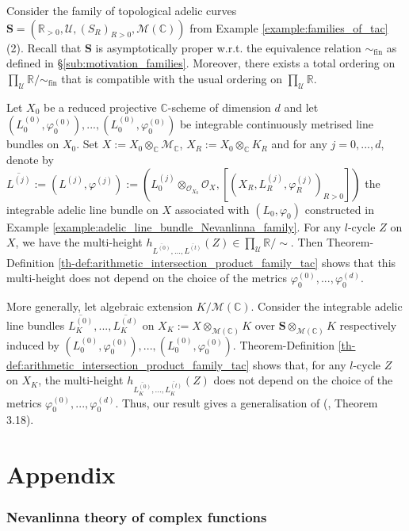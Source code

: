 \documentclass [11pt,reqno]{amsart}
\def\bC{{\mathbb{C}}}
\def\bR{{\mathbb{R}}}
\newcommand{\1}{\mathmybb{1}}
\def\cM{{\mathcal{M}}}
\def\cO{{\mathcal{O}}}
\def\cU{{\mathcal{U}}}
\def\fin{\mathrm{fin}}
\begin{document}
\begin{example}
\label{example:arithmetic_intersection_product_Nevanlinna}
Consider the family of topological adelic curves $\mathbf{S}=(\bR_{>0},\cU,(S_{R})_{R>0},\cM(\bC))$ from Example \ref{example:families_of_tac} (2). Recall that $\mathbf{S}$ is asymptotically proper w.r.t. the equivalence relation $\sim_{\fin}$ as defined in \S \ref{sub:motivation_families}. Moreover, there exists a total ordering on $\prod_{\cU}\bR/\sim_{\fin}$ that is compatible with the usual ordering on $\prod_{\cU}\bR$.

Let $X_{0}$ be a reduced projective $\bC$-scheme of dimension $d$ and let $(L^{(0)}_{0},\varphi^{(0)}_{0}),...,(L^{(0)}_{0},\varphi^{(0)}_{0})$ be integrable continuously metrised line bundles on $X_{0}$. Set $X:=X_{0}\otimes_{\bC}\cM_{\bC}$, $X_{R}:=X_{0}\otimes_{\bC}K_{R}$ and for any $j=0,...,d$, denote by $\overline{L^{(j)}}:=(L^{(j)},\varphi^{(j)}):=(L^{(j)}_{0}\otimes_{\cO_{X_{0}}}\cO_{X},[(X_{R},L^{(j)}_{R},\varphi^{(j)}_{R})_{R>0}])$ the integrable adelic line bundle on $X$ associated with $(L_{0},\varphi_{0})$ constructed in Example \ref{example:adelic_line_bundle_Nevanlinna_family}. For any $l$-cycle $Z$ on $X$, we have the multi-height $h_{\overline{L^{(0)}},...,\overline{L^{(t)}}}(Z)\in\prod_{\cU}\bR/\sim$. Then Theorem-Definition \ref{th-def:arithmetic_intersection_product_family_tac} shows that this multi-height does not depend on the choice of the metrics $\varphi^{(0)}_{0},...,\varphi^{(d)}_{0}$.

More generally, let algebraic extension $K/\cM(\bC)$. Consider the integrable adelic line bundles $\overline{L^{(0)}_{K}},...,\overline{L^{(d)}_{K}}$ on $X_{K}:=X\otimes_{\cM(\bC)}K$ over $\mathbf{S}\otimes_{\cM(\bC)}K$ respectively induced by $(L^{(0)}_{0},\varphi^{(0)}_{0}),...,(L^{(0)}_{0},\varphi^{(0)}_{0})$. Theorem-Definition \ref{th-def:arithmetic_intersection_product_family_tac} shows that, for any $l$-cycle $Z$ on $X_{K}$, the multi-height $h_{\overline{L_{K}^{(0)}},...,\overline{L_{K}^{(t)}}}(Z)$ does not depend on the choice of the metrics $\varphi^{(0)}_{0},...,\varphi^{(d)}_{0}$. Thus, our result gives a generalisation of (\cite{Gubler97}, Theorem 3.18).
\end{example}

\appendix
\part*{Appendix}
\section{Nevanlinna theory of complex functions}
\label{sec:Nevanlinna_classical}
\end{document}
